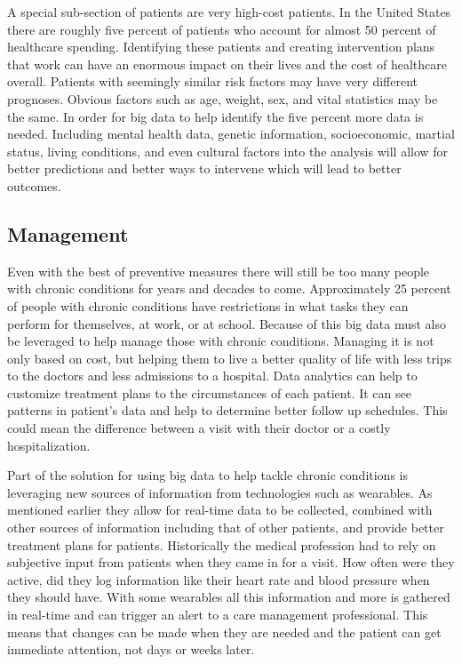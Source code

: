 \documentclass[sigconf]{acmart}
\begin{document}
A special sub-section of patients are very high-cost patients.  In the 
United States there are roughly five percent of patients who account 
for almost 50 percent of healthcare spending\cite{HealthAffairs}.  
Identifying these patients and creating intervention plans that work 
can have an enormous impact on their lives and the cost of healthcare 
overall.  Patients with seemingly similar risk factors may have very 
different prognoses.  Obvious factors such as age, weight, sex, and 
vital statistics may be the same.  In order for big data to help 
identify the five percent more data is needed.  Including mental health 
data, genetic information, socioeconomic, martial status, living 
conditions, and even cultural factors into the analysis will allow for 
better predictions and better ways to intervene which will lead to 
better outcomes\cite{HealthAffairs}. 

\subsection{Management}
Even with the best of preventive measures there will still be too many 
people with chronic conditions for years and decades to come.  
Approximately 25 percent of people with chronic conditions have 
restrictions in what tasks they can perform for themselves, at work, 
or at school\cite{ScalableHealth}.  Because of this big data must also 
be leveraged to help manage those with chronic conditions.  Managing 
it is not only based on cost, but helping them to live a better quality 
of life with less trips to the doctors and less admissions to a 
hospital.  Data analytics can help to customize treatment plans to the 
circumstances of each patient.  It can see patterns in patient's data 
and help to determine better follow up schedules.  This could mean the 
difference between a visit with their doctor or a costly 
hospitalization\cite{MedCity}.

Part of the solution for using big data to help tackle chronic 
conditions is leveraging new sources of information from technologies 
such as wearables.  As mentioned earlier they allow for real-time 
data to be collected, combined with other sources of information 
including that of other patients, and provide better treatment plans 
for patients.  Historically the medical profession had to rely on 
subjective input from patients when they came in for a visit.  How 
often were they active, did they log information like their heart 
rate and blood pressure when they should have.  With some wearables 
all this information and more is gathered in real-time and can 
trigger an alert to a care management 
professional\cite{ScalableHealth}.  This means that changes can be 
made when they are needed and the patient can get immediate 
attention, not days or weeks later.
\end{document}
